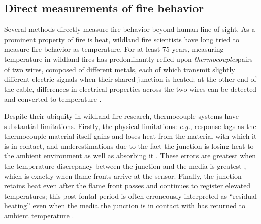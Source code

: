 \documentclass[fire,article,submit,oneauthor,pdftex]{Definitions/mdpi}
\begin{document}
\subsection{Direct measurements of fire behavior} 

Several methods directly measure fire behavior beyond human line of sight. 
As a prominent property of fire is heat, wildland fire scientists have long tried to measure fire behavior as temperature.
For at least 75 years, measuring temperature in wildland fires has predominantly relied upon \emph{thermocouples}\textemdash pairs of two wires, composed of different metals, each of which transmit slightly different electric signals when their shared junction is heated; at the other end of the cable, differences in electrical properties across the two wires can be detected and converted to temperature \cite{vaartaja1949, engle1989,mcgranahan2020a, pavlasek2015, shannon2003}. 

Despite their ubiquity in wildland fire research, thermocouple systems have substantial limitations. 
Firstly, the physical limitations: \emph{e.g.}, response lags as the thermocouple material itself gains and loses heat from the material with which it is in contact, and  underestimations due to the fact the junction is losing heat to the ambient environment as well as absorbing it \cite{walker1968,lemaire2017}.  These errors are greatest when the temperature discrepancy between the junction and the media is greatest \cite{blevins1999}, which is exactly when flame fronts arrive at the sensor.
Finally, the junction retains heat even after the flame front passes and continues to register elevated temperatures; this post-fontal period is often erroneously interpreted as ``residual heating'' even when the media the junction is in contact with has returned to ambient temperature \cite{mcgranahan2020a}. 
\end{document}
